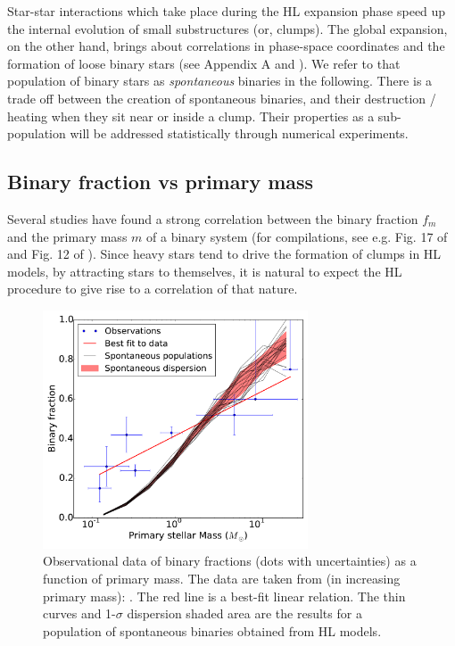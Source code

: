 Star-star interactions which take place during the HL expansion phase speed up the internal evolution of small substructures (or, clumps). The global expansion, on the other hand, brings about correlations in phase-space coordinates and the formation of loose binary stars (see Appendix A and \citealt{Kouwenhoven2010,Moeckel2011}). We refer to that population of binary stars as {\it spontaneous} binaries in the following. There is a trade off between the creation of spontaneous binaries, and their destruction / heating when they sit near or inside a clump. Their properties as a sub-population will be addressed statistically through numerical experiments.


\subsection{Binary fraction vs primary mass}
\label{Sub:spontaneous_binaryfractions}

Several studies have found a strong correlation between the binary fraction $f_m$ and the primary mass $m$ of a binary system (for compilations, see e.g. Fig. 17 of \citealt{Bate2012} and Fig. 12 of \citealt{Raghavan2010}). Since heavy stars tend to drive the formation of clumps in HL models, by attracting stars to themselves, it is natural to expect the HL procedure to give rise to a correlation of that nature.  



\begin{figure}
\begin{center}
\includegraphics[width=0.7\textwidth]{Figures/5_spontaneous_primarymass}
\caption{Observational data of binary fractions (dots with uncertainties) as a function of primary mass. The data are taken from (in increasing primary mass): \protect\cite{Close2003,Basri2006,Fischer1992,Wardduong2015,Raghavan2010,Patience2002,Preibisch1999,Mason1998}. The red line is a  best-fit linear relation. The thin curves and 1-$\sigma$ dispersion shaded area are the results for a population of  spontaneous binaries obtained from HL  models.}
\label{Fig:5_spontaneous_primarymass}
\end{center}
\end{figure}




